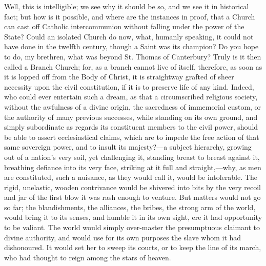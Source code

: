 Well, this is intelligible; we see why it should be so, and we see
it in historical fact; but how is it possible, and where are the
instances in proof, that a Church can cast off Catholic intercommunion
without falling under the power of the State? Could an isolated Church
do now, what, humanly speaking, it could not have done in the twelfth
century, though a Saint was its champion? Do you hope to do, my
brethren, what was beyond St. Thomas of Canterbury? Truly is it then
called a Branch Church; for, as a branch cannot live of itself,
therefore, as soon as it is lopped off from the Body of Christ, it is
straightway grafted of sheer necessity upon the civil constitution, if
it is to preserve life of any kind. Indeed, who could ever entertain
such a dream, as that a circumscribed religious society, without the
awfulness of a divine origin, the sacredness of immemorial custom, or
the authority of many previous successes, while standing on its own
ground, and simply subordinate as regards its constituent members to
the civil power, should be able to assert ecclesiastical claims, which
are to impede the free action of that same sovereign power, and to
insult its majesty?—a subject hierarchy, growing out of a nation's
very soil, yet challenging it, standing breast to breast against it,
breathing defiance into its very face, striking at it full and
straight,—why, as men are constituted, such a nuisance, as they
would call it, would be intolerable. The rigid, unelastic, wooden
contrivance would be shivered into bits by the very recoil and jar of
the first blow it was rash enough to venture. But matters would not go
so far; the blandishments, the alliances, the bribes, the strong arm
of the world, would bring it to its senses, and humble it in its own
sight, ere it had opportunity to be valiant. The world would simply
over-master the presumptuous claimant to divine authority, and would
use for its own purposes the slave whom it had dishonoured. It would
set her to sweep its courts, or to keep the line of its march, who had
thought to reign among the stars of heaven.

